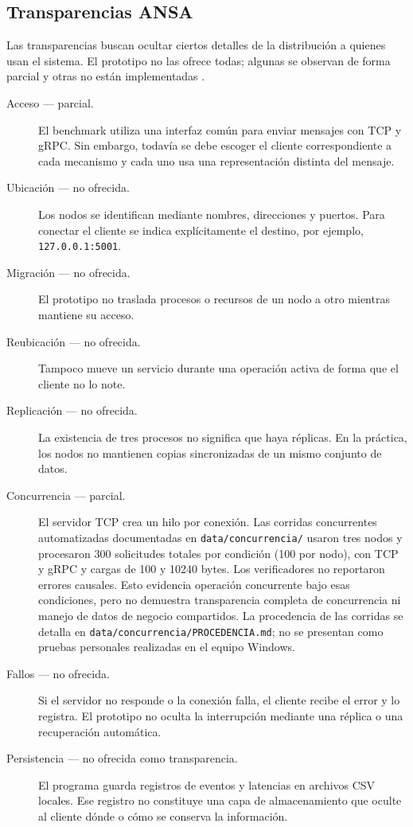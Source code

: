 \subsection{Transparencias ANSA}

Las transparencias buscan ocultar ciertos detalles de la distribución a quienes usan el sistema. El prototipo no las ofrece todas; algunas se observan de forma parcial y otras no están implementadas \cite{vanSteenTanenbaum2023}.

\begin{description}
    \item[Acceso — parcial.] El benchmark utiliza una interfaz común para enviar mensajes con TCP y gRPC. Sin embargo, todavía se debe escoger el cliente correspondiente a cada mecanismo y cada uno usa una representación distinta del mensaje.

    \item[Ubicación — no ofrecida.] Los nodos se identifican mediante nombres, direcciones y puertos. Para conectar el cliente se indica explícitamente el destino, por ejemplo, \texttt{127.0.0.1:5001}.

    \item[Migración — no ofrecida.] El prototipo no traslada procesos o recursos de un nodo a otro mientras mantiene su acceso.

    \item[Reubicación — no ofrecida.] Tampoco mueve un servicio durante una operación activa de forma que el cliente no lo note.

    \item[Replicación — no ofrecida.] La existencia de tres procesos no significa que haya réplicas. En la práctica, los nodos no mantienen copias sincronizadas de un mismo conjunto de datos.

    \item[Concurrencia — parcial.] El servidor TCP crea un hilo por conexión. Las corridas concurrentes automatizadas documentadas en \texttt{data/concurrencia/} usaron tres nodos y procesaron 300 solicitudes totales por condición (100 por nodo), con TCP y gRPC y cargas de 100 y 10240 bytes. Los verificadores no reportaron errores causales. Esto evidencia operación concurrente bajo esas condiciones, pero no demuestra transparencia completa de concurrencia ni manejo de datos de negocio compartidos. La procedencia de las corridas se detalla en \texttt{data/concurrencia/PROCEDENCIA.md}; no se presentan como pruebas personales realizadas en el equipo Windows.

    \item[Fallos — no ofrecida.] Si el servidor no responde o la conexión falla, el cliente recibe el error y lo registra. El prototipo no oculta la interrupción mediante una réplica o una recuperación automática.

    \item[Persistencia — no ofrecida como transparencia.] El programa guarda registros de eventos y latencias en archivos CSV locales. Ese registro no constituye una capa de almacenamiento que oculte al cliente dónde o cómo se conserva la información.
\end{description}

